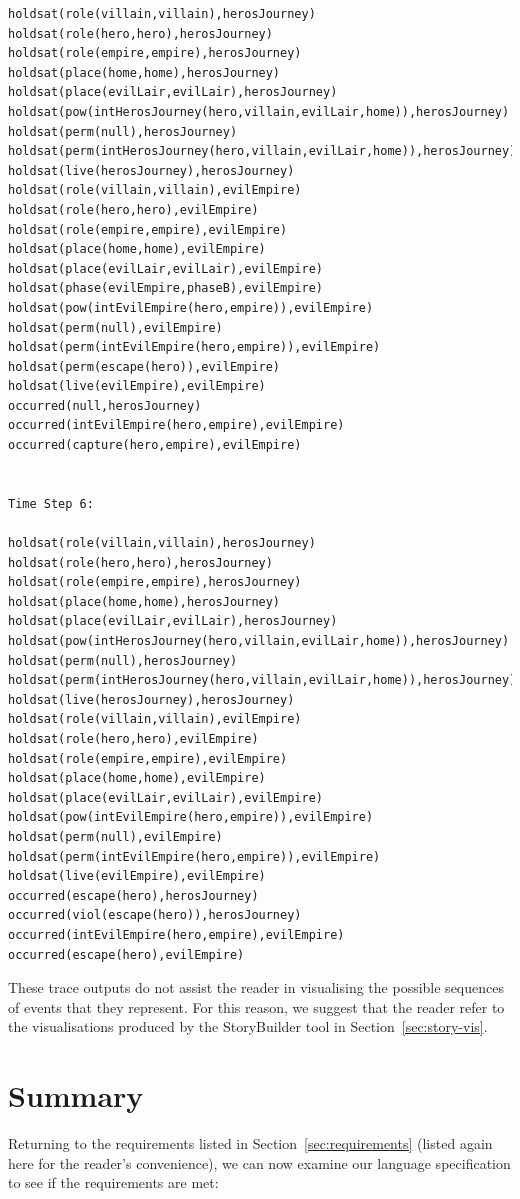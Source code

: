 \documentclass[11pt]{report}
\begin{document}
\begin{lstlisting}[label={lst:hero-evil-trace},caption={Example trace for both the ``Evil Empire'' and
``Hero's Journey'' tropes combined together}]
holdsat(role(villain,villain),herosJourney)
holdsat(role(hero,hero),herosJourney)
holdsat(role(empire,empire),herosJourney)
holdsat(place(home,home),herosJourney)
holdsat(place(evilLair,evilLair),herosJourney)
holdsat(pow(intHerosJourney(hero,villain,evilLair,home)),herosJourney)
holdsat(perm(null),herosJourney)
holdsat(perm(intHerosJourney(hero,villain,evilLair,home)),herosJourney)
holdsat(live(herosJourney),herosJourney)
holdsat(role(villain,villain),evilEmpire)
holdsat(role(hero,hero),evilEmpire)
holdsat(role(empire,empire),evilEmpire)
holdsat(place(home,home),evilEmpire)
holdsat(place(evilLair,evilLair),evilEmpire)
holdsat(phase(evilEmpire,phaseB),evilEmpire)
holdsat(pow(intEvilEmpire(hero,empire)),evilEmpire)
holdsat(perm(null),evilEmpire)
holdsat(perm(intEvilEmpire(hero,empire)),evilEmpire)
holdsat(perm(escape(hero)),evilEmpire)
holdsat(live(evilEmpire),evilEmpire)
occurred(null,herosJourney)
occurred(intEvilEmpire(hero,empire),evilEmpire)
occurred(capture(hero,empire),evilEmpire)


Time Step 6:

holdsat(role(villain,villain),herosJourney)
holdsat(role(hero,hero),herosJourney)
holdsat(role(empire,empire),herosJourney)
holdsat(place(home,home),herosJourney)
holdsat(place(evilLair,evilLair),herosJourney)
holdsat(pow(intHerosJourney(hero,villain,evilLair,home)),herosJourney)
holdsat(perm(null),herosJourney)
holdsat(perm(intHerosJourney(hero,villain,evilLair,home)),herosJourney)
holdsat(live(herosJourney),herosJourney)
holdsat(role(villain,villain),evilEmpire)
holdsat(role(hero,hero),evilEmpire)
holdsat(role(empire,empire),evilEmpire)
holdsat(place(home,home),evilEmpire)
holdsat(place(evilLair,evilLair),evilEmpire)
holdsat(pow(intEvilEmpire(hero,empire)),evilEmpire)
holdsat(perm(null),evilEmpire)
holdsat(perm(intEvilEmpire(hero,empire)),evilEmpire)
holdsat(live(evilEmpire),evilEmpire)
occurred(escape(hero),herosJourney)
occurred(viol(escape(hero)),herosJourney)
occurred(intEvilEmpire(hero,empire),evilEmpire)
occurred(escape(hero),evilEmpire)
\end{lstlisting}

These trace outputs do not assist the reader in visualising the possible
sequences of events that they represent. For this reason, we suggest that the
reader refer to the visualisations produced by the StoryBuilder tool in Section~\ref{sec:story-vis}.


\section{Summary}
\label{sec:tropical-summary}
Returning to the requirements listed in Section~\ref{sec:requirements} (listed
again here for the reader's convenience), we can now examine our language
specification to see if the requirements are met:
\end{document}
